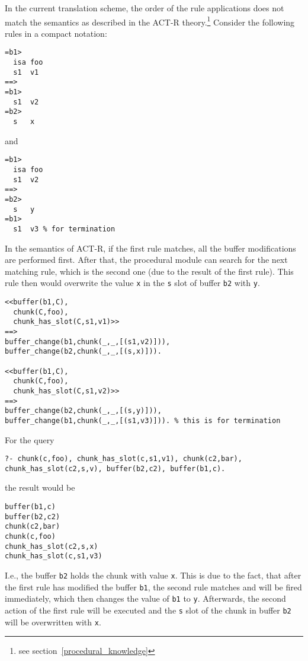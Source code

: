 In the current translation scheme, the order of the rule applications does not match the semantics as described in the ACT-R theory.\footnote{see section~\ref{procedural_knowledge}} Consider the following rules in a compact notation:

\begin{lstlisting}
=b1>
  isa foo
  s1  v1
==>
=b1>
  s1  v2
=b2>
  s   x
\end{lstlisting}

and

\begin{lstlisting}
=b1>
  isa foo
  s1  v2
==>
=b2>
  s   y
=b1>
  s1  v3 % for termination
\end{lstlisting}

In the semantics of ACT-R, if the first rule matches, all the buffer modifications are performed first. After that, the procedural module can search for the next matching rule, which is the second one (due to the result of the first rule). This rule then would overwrite the value \lstinline|x| in the \lstinline|s| slot of buffer \lstinline|b2| with \lstinline|y|.

\begin{lstlisting}
<<buffer(b1,C),
  chunk(C,foo),
  chunk_has_slot(C,s1,v1)>>
==>
buffer_change(b1,chunk(_,_,[(s1,v2)])),
buffer_change(b2,chunk(_,_,[(s,x)])).

<<buffer(b1,C),
  chunk(C,foo),
  chunk_has_slot(C,s1,v2)>>
==>
buffer_change(b2,chunk(_,_,[(s,y)])),
buffer_change(b1,chunk(_,_,[(s1,v3)])). % this is for termination
\end{lstlisting}

For the query

\begin{lstlisting}
?- chunk(c,foo), chunk_has_slot(c,s1,v1), chunk(c2,bar), chunk_has_slot(c2,s,v), buffer(b2,c2), buffer(b1,c).
\end{lstlisting}

the result would be

\begin{lstlisting}
buffer(b1,c)
buffer(b2,c2)
chunk(c2,bar)
chunk(c,foo)
chunk_has_slot(c2,s,x)
chunk_has_slot(c,s1,v3)
\end{lstlisting}

I.e., the buffer \lstinline|b2| holds the chunk with value \lstinline|x|. This is due to the fact, that after the first rule has modified the buffer \lstinline|b1|, the second rule matches and will be fired immediately, which then changes the value of \lstinline|b1| to \lstinline|y|. Afterwards, the second action of the first rule will be executed and the \lstinline|s| slot of the chunk in buffer \lstinline|b2| will be overwritten with \lstinline|x|.

